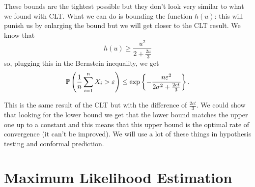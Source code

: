 \documentclass[12pt]{report}
\begin{document}
\begin{remark}
	These bounds are the tightest possible but they don't look very similar to what we found with CLT. What we can do is bounding the function $h(u)$: this will punish us by enlarging the bound but we will get closer to the CLT result.
We know that
\begin{equation*}
	h(u)\geq\frac{u^{2}}{2+\frac{2u}{3}}
\end{equation*}
so, plugging this in the Bernstein inequality, we get
\begin{equation*}
	\mathbb{P}\left(\frac{1}{n}\sum_{i=1}^{n}X_{i}>\varepsilon\right)\leq\exp\left\{-\frac{n\varepsilon^{2}}{2\sigma^{2}+\frac{2ct}{3}}\right\}.
\end{equation*}
\end{remark}
This is the same result of the CLT but with the difference of $\frac{2ct}{3}$. We could show that looking for the lower bound we get that the lower bound matches the upper one up to a constant and this means that this upper bound is the optimal rate of convergence (it can't be improved). We will use a lot of these things in hypothesis testing and conformal prediction.
\section{Maximum Likelihood Estimation}
\end{document}
